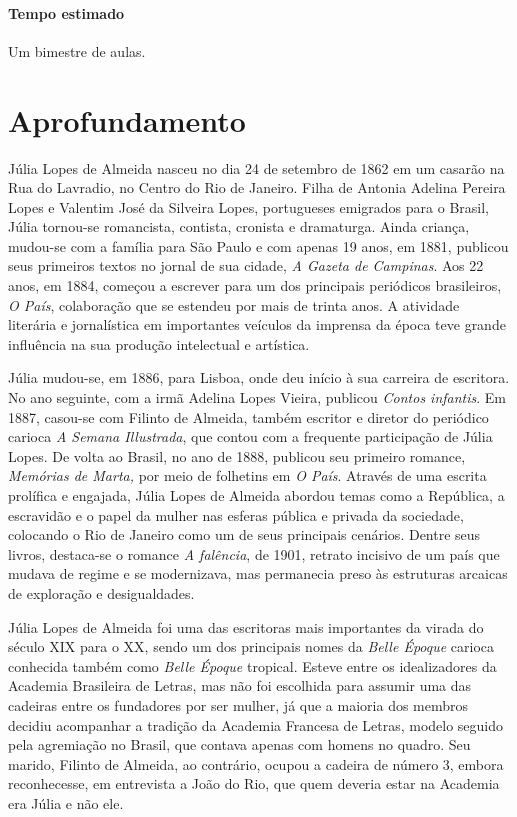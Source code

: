 \documentclass[12pt]{extarticle}
\begin{document}
\paragraph{Tempo estimado} Um bimestre de aulas.

\section{Aprofundamento}

Júlia Lopes de Almeida nasceu no dia 24 de setembro de 1862 em um
casarão na Rua do Lavradio, no Centro do Rio de Janeiro. Filha de
Antonia Adelina Pereira Lopes e Valentim José da Silveira Lopes,
portugueses emigrados para o Brasil, Júlia tornou-se romancista,
contista, cronista e dramaturga. Ainda criança, mudou-se com a família
para São Paulo e com apenas 19 anos, em 1881, publicou seus primeiros
textos no jornal de sua cidade, \emph{A Gazeta de Campinas}. Aos 22
anos, em 1884, começou a escrever para um dos principais periódicos
brasileiros, \emph{O País}, colaboração que se estendeu por mais de
trinta anos. A atividade literária e jornalística em importantes
veículos da imprensa da época teve grande influência na sua produção
intelectual e artística.

Júlia mudou-se, em 1886, para Lisboa, onde deu início à sua carreira de
escritora. No ano seguinte, com a irmã Adelina Lopes Vieira, publicou
\emph{Contos infantis}. Em 1887, casou-se com Filinto de Almeida, também
escritor e diretor do periódico carioca \emph{A Semana Illustrada}, que
contou com a frequente participação de Júlia Lopes. De volta ao Brasil,
no ano de 1888, publicou seu primeiro romance, \emph{Memórias de Marta,}
por meio de folhetins em \emph{O País}. Através de uma escrita prolífica
e engajada, Júlia Lopes de Almeida abordou temas como a República, a
escravidão e o papel da mulher nas esferas pública e privada da
sociedade, colocando o Rio de Janeiro como um de seus principais
cenários. Dentre seus livros, destaca-se o romance \emph{A falência}, de
1901, retrato incisivo de um país que mudava de regime e se modernizava,
mas permanecia preso às estruturas arcaicas de exploração e
desigualdades.

Júlia Lopes de Almeida foi uma das escritoras mais importantes da virada
do século XIX para o XX, sendo um dos principais nomes da \emph{Belle
Époque} carioca conhecida também como \emph{Belle Époque} tropical.
Esteve entre os idealizadores da Academia Brasileira de Letras, mas não
foi escolhida para assumir uma das cadeiras entre os fundadores por ser
mulher, já que a maioria dos membros decidiu acompanhar a tradição da
Academia Francesa de Letras, modelo seguido pela agremiação no Brasil,
que contava apenas com homens no quadro. Seu marido, Filinto de Almeida,
ao contrário, ocupou a cadeira de número 3, embora reconhecesse, em
entrevista a João do Rio, que quem deveria estar na Academia era Júlia
e não ele.
\end{document}
